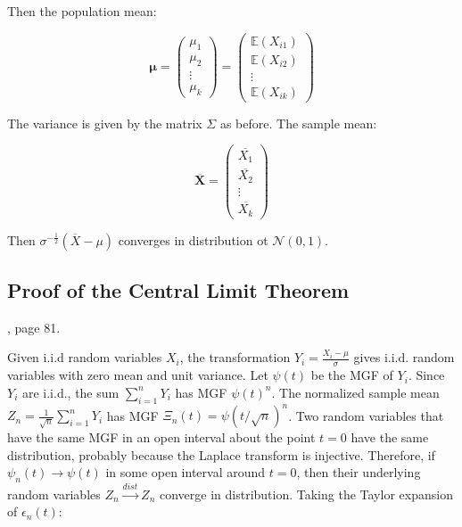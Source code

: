 Then the population mean:

\begin{equation}
\mathbf{\mu} = \left(\begin{array}{c} \mu_1 \\ \mu_2 \\ \vdots \\ \mu_k \end{array} \right) =  \left(\begin{array}{c} \mathbb{E}(X_{i1}) \\ \mathbb{E}(X_{i2}) \\ \vdots \\ \mathbb{E}(X_{ik}) \end{array} \right)
\end{equation}

The variance is given by the matrix $\Sigma$ as before. The sample mean:

\begin{equation}
\overline{\mathbf{X}} = \left(\begin{array}{c}\overline{X_{1}}\\ \overline{X_{2}} \\ \vdots \\ \overline{X_{k}} \end{array}\right)
\end{equation}

Then $\sigma^{-\frac{1}{2}} (\overline{X}-\mu)$ converges in distribution ot $\mathscr{N}(0,1)$.


\subsection{Proof of the Central Limit Theorem}
, page 81.

Given i.i.d random variables $X_i$, the transformation $Y_i = \frac{X_i-\mu}{\sigma}$ gives i.i.d. random variables with zero mean and unit variance. Let $\psi(t)$ be the MGF of $Y_i$. Since $Y_i$ are i.i.d., the sum $\sum_{i=1}^n Y_i$ has MGF $\psi(t)^n$. The normalized sample mean $Z_n = \frac{1}{\sqrt{n}}\sum_{i=1}^n Y_i$ has MGF $\Xi_n(t)=\psi(t/\sqrt{n})^n$. Two random variables that have the same MGF in an open interval about the point $t=0$ have the same distribution, probably because the Laplace transform is injective. Therefore, if $\psi_n(t)\rightarrow \psi(t)$ in some open interval around $t=0$, then their underlying random variables $Z_n \xrightarrow{dist}Z_n$ converge in distribution. Taking the Taylor expansion of $\epsilon_n(t)$:

